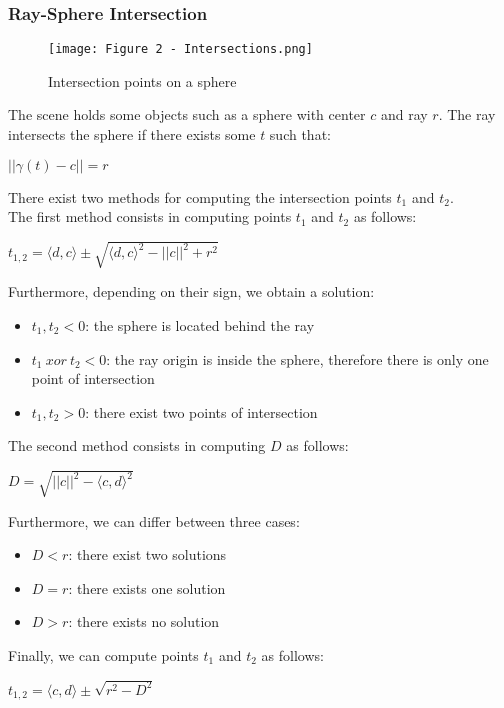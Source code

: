 \documentclass{article}
\begin{document}
\subsubsection{Ray-Sphere Intersection}
\begin{figure}[H]
    \centering
    \texttt{[image: Figure 2 - Intersections.png]}
    \caption{Intersection points on a sphere}
\end{figure}
The scene holds some objects such as a sphere with center $c$ and ray $r$. The ray intersects the sphere if there exists some $t$ such that:
\begin{center}
    $||\gamma(t) - c|| = r $
\end{center}
There exist two methods for computing the intersection points $t_1$ and $t_2$. \\ 
The first method consists in computing points $t_1$ and $t_2$ as follows:
\begin{center}
    $t_{1,2} = \langle d,c\rangle \pm \sqrt{\langle d,c\rangle^2 - ||c||^2 + r^2} $
\end{center}
Furthermore, depending on their sign, we obtain a solution:
\begin{itemize}
    \item $ t_1, t_2 < 0 $: the sphere is located behind the ray
    \item $ t_1 \ xor \ t_2 < 0 $: the ray origin is inside the sphere, therefore there is only one point of intersection
    \item $ t_1, t_2 > 0 $: there exist two points of intersection
\end{itemize}
The second method consists in computing $D$ as follows:
\begin{center}
    $ D = \sqrt{||c||^2 - \langle c,d\rangle^2}$
\end{center}
Furthermore, we can differ between three cases:
\begin{itemize}
    \item $ D < r $: there exist two solutions
    \item $ D = r $: there exists one solution
    \item $ D > r $: there exists no solution
\end{itemize}
Finally, we can compute points $t_1$ and $t_2$ as follows:
\begin{center}
    $t_{1,2} = \langle c,d\rangle \pm \sqrt{r^2 - D^2}$
\end{center}

\end{document}
